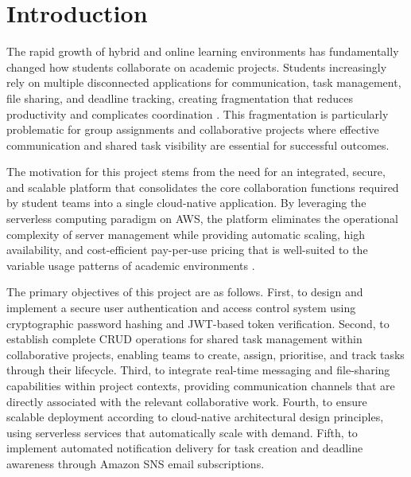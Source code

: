 \documentclass[conference]{IEEEtran}
\begin{document}
\section{Introduction}

The rapid growth of hybrid and online learning environments has fundamentally changed how students collaborate on academic projects. Students increasingly rely on multiple disconnected applications for communication, task management, file sharing, and deadline tracking, creating fragmentation that reduces productivity and complicates coordination \cite{cloudpatterns}. This fragmentation is particularly problematic for group assignments and collaborative projects where effective communication and shared task visibility are essential for successful outcomes.

The motivation for this project stems from the need for an integrated, secure, and scalable platform that consolidates the core collaboration functions required by student teams into a single cloud-native application. By leveraging the serverless computing paradigm on AWS, the platform eliminates the operational complexity of server management while providing automatic scaling, high availability, and cost-efficient pay-per-use pricing that is well-suited to the variable usage patterns of academic environments \cite{serverless}.

The primary objectives of this project are as follows. First, to design and implement a secure user authentication and access control system using cryptographic password hashing and JWT-based token verification. Second, to establish complete CRUD operations for shared task management within collaborative projects, enabling teams to create, assign, prioritise, and track tasks through their lifecycle. Third, to integrate real-time messaging and file-sharing capabilities within project contexts, providing communication channels that are directly associated with the relevant collaborative work. Fourth, to ensure scalable deployment according to cloud-native architectural design principles, using serverless services that automatically scale with demand. Fifth, to implement automated notification delivery for task creation and deadline awareness through Amazon SNS email subscriptions.

\end{document}
